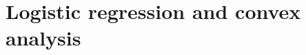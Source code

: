 \documentclass[toc, titlepaged]{../cs-classes/cs-classes}
\begin{document}
\section{Logistic regression and convex analysis}
%
%
\end{document}
